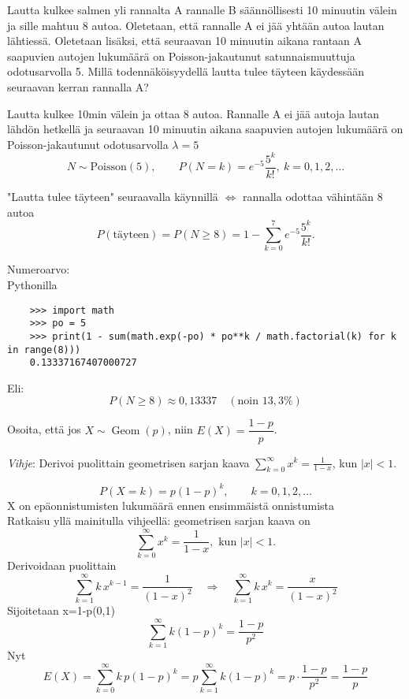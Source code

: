 \documentclass[12pt,a4paper]{article}
\begin{document}
\pagebreak
{}
Lautta kulkee salmen yli rannalta A rannalle B säännöllisesti 
10 minuutin välein ja sille mahtuu 8 autoa. Oletetaan, että rannalle 
A ei jää yhtään autoa lautan lähtiessä. Oletetaan lisäksi, että seuraavan 
10 minuutin aikana rantaan A saapuvien autojen lukumäärä on 
Poisson-jakautunut satunnaismuuttuja odotusarvolla 5. Millä 
todennäköisyydellä lautta tulee täyteen käydessään seuraavan 
kerran rannalla A? 
\vspace{0.4cm}

Lautta kulkee 10min välein ja ottaa 8 autoa. 
Rannalle A ei jää autoja lautan lähdön hetkellä ja 
seuraavan 10 minuutin aikana saapuvien autojen lukumäärä 
on Poisson-jakautunut odotusarvolla $\lambda=5$
\[
N \sim \mathrm{Poisson}(5),\qquad P(N=k)=e^{-5}\frac{5^k}{k!},\ k=0,1,2,\dots
\]

"Lautta tulee täyteen" seuraavalla käynnillä $\iff$ rannalla odottaa vähintään 8 autoa
\[
P(\text{täyteen})=P(N\ge 8)=1-\sum_{k=0}^{7} e^{-5}\frac{5^k}{k!}.
\]

Numeroarvo:\\
Pythonilla
\begin{verbatim}
    >>> import math
    >>> po = 5
    >>> print(1 - sum(math.exp(-po) * po**k / math.factorial(k) for k in range(8)))
    0.13337167407000727
\end{verbatim}
Eli:
\[
P(N\ge 8)\approx 0{,}13337 \quad (\text{noin }13{,}3\%)
\]









\pagebreak
{}
Osoita, että jos $X\sim\operatorname{Geom}(p)$, niin $E(X)=\dfrac{1-p}{p}$. 

\noindent\emph{Vihje}: Derivoi puolittain geometrisen sarjan kaava $\displaystyle\sum_{k=0}^{\infty}x^{k}=\frac{1}{1-x}$, kun $|x|<1$.

\vspace{0.8cm}


\[
P(X=k)=p(1-p)^k,\qquad k=0,1,2,\dots
\]
X on epäonnistumisten lukumäärä ennen ensimmäistä onnistumista\\

Ratkaisu yllä mainitulla vihjeellä:
geometrisen sarjan kaava on
\[
\sum_{k=0}^\infty x^{k}=\frac{1}{1-x}, \text{ kun } |x|<1.
\]
Derivoidaan puolittain
\[
\sum_{k=1}^\infty k\,x^{k-1}=\frac{1}{(1-x)^2}
\quad\Rightarrow\quad
\sum_{k=1}^\infty k\,x^{k}=\frac{x}{(1-x)^2}
\]
Sijoitetaan x=1-p\in(0,1)
\[
\sum_{k=1}^\infty k(1-p)^k=\frac{1-p}{p^2}
\]
Nyt
\[
E(X)=\sum_{k=0}^\infty k\,p(1-p)^k
= p\sum_{k=1}^\infty k(1-p)^k
= p\cdot \frac{1-p}{p^2}
= \frac{1-p}{p}
\]
\end{document}
